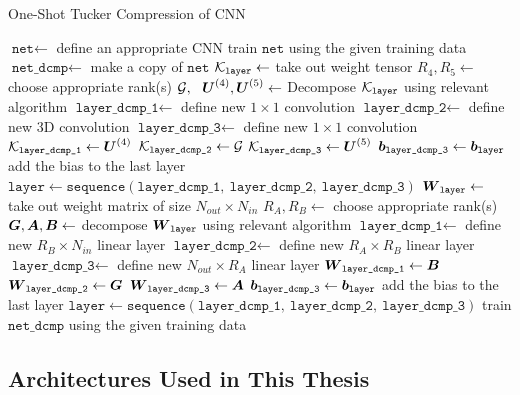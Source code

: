 \begin{algorithm} \caption{One-Shot Tucker Compression of CNN} \label{alg:one_shot_tucker}
\begin{algorithmic}[1]
    \State $\texttt{net} \leftarrow $ define an appropriate CNN
    \State train $\texttt{net}$ using the given training data
    \State $\texttt{net\_dcmp} \leftarrow $ make a copy of $\texttt{net}$
        \State $\mathcal{K}_{\texttt{layer}} \leftarrow $ take out weight tensor
        \State $R_4, R_5 \leftarrow$ choose appropriate rank(s)
        \State $\tensor{G}, \ \ \bs{U}^{(4)}, \bs{U}^{(5)} \leftarrow $ Decompose $\mathcal{K}_{\texttt{layer}}$ using relevant algorithm 
        \State $\texttt{layer\_dcmp\_1} \leftarrow $ define new $1\times 1$ convolution 
        \State $\texttt{layer\_dcmp\_2} \leftarrow $ define new 3D convolution
        \State $\texttt{layer\_dcmp\_3} \leftarrow $ define new $1\times 1$ convolution 
        \State $\mathcal{K}_{\texttt{layer\_dcmp\_1}} \leftarrow \boldsymbol{U}^{(4)}$ 
        \State $\mathcal{K}_{\texttt{layer\_dcmp\_2}} \leftarrow \mathcal{G}$
        \State $\mathcal{K}_{\texttt{layer\_dcmp\_3}} \leftarrow \boldsymbol{U}^{(5)}$ 
        \State $\boldsymbol{b}_{\texttt{layer\_dcmp\_3}} \leftarrow \boldsymbol{b}_{\texttt{layer}}$ add the bias to the last layer 
        \State $\texttt{layer} \leftarrow \texttt{sequence}(\texttt{layer\_dcmp\_1}, \  \texttt{layer\_dcmp\_2}, \ \texttt{layer\_dcmp\_3})$
    \EndFor
        \State $\boldsymbol{W}_{\texttt{layer}} \leftarrow $ take out weight matrix of size $N_{out} \times N_{in}$
        \State $R_A, R_B \leftarrow $ choose appropriate rank(s)
        \State $\boldsymbol{G}, \boldsymbol{A}, \boldsymbol{B} \leftarrow $ decompose $\boldsymbol{W}_{\texttt{layer}}$ using relevant algorithm 
        \State $\texttt{layer\_dcmp\_1} \leftarrow $ define new $R_B \times N_{in}$ linear layer 
        \State $\texttt{layer\_dcmp\_2} \leftarrow $ define new $R_A \times R_B$ linear layer 
        \State $\texttt{layer\_dcmp\_3} \leftarrow $ define new $N_{out} \times R_A$ linear layer 
        \State $\boldsymbol{W}_{\texttt{layer\_dcmp\_1}} \leftarrow \boldsymbol{B}$ 
        \State $\boldsymbol{W}_{\texttt{layer\_dcmp\_2}} \leftarrow \boldsymbol{G}$
        \State $\boldsymbol{W}_{\texttt{layer\_dcmp\_3}} \leftarrow \boldsymbol{A}$ 
        \State $\boldsymbol{b}_{\texttt{layer\_dcmp\_3}} \leftarrow \boldsymbol{b}_{\texttt{layer}}$ add the bias to the last layer 
        \State $\texttt{layer} \leftarrow \texttt{sequence}(\texttt{layer\_dcmp\_1}, \ \texttt{layer\_dcmp\_2}, \ \texttt{layer\_dcmp\_3})$
    \EndFor
    \State train $\texttt{net\_dcmp}$ using the given training data 
\end{algorithmic}
\end{algorithm}

\subsection{Architectures Used in This Thesis}